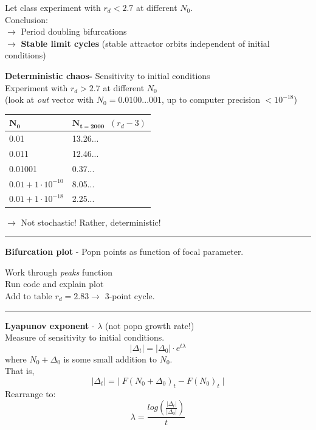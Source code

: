 \documentclass{article}
\newcommand{\note}[1]{\colorbox{gray!30}{#1}}
\newcommand{\ind}{\-\hspace{1cm}}
\begin{document}
\note{Let class experiment with $r_d<2.7$ at different $N_0$.}\\
Conclusion:\\
 \ind $\to$ Period doubling bifurcations\\
\ind \ind $\to$ \textbf{Stable limit cycles} (stable attractor orbits independent of initial conditions)

\textbf{Deterministic chaos-} Sensitivity to initial conditions\\
\note{Experiment with $r_d > 2.7$ at different $N_0$} \\
\ind (look at \emph{out} vector with $N_0=0.0100...001$, up to computer precision $<10^{-18}$)

\begin{table}[h]
\centering
\begin{tabular}{ll}
$\mathbf{N_0}$ & $\mathbf{N_{t=2000}}\;\; (r_d-3)$ \\ 
\hline
0.01 & 13.26...\\
0.011 & 12.46... \\
0.01001 & 0.37... \\
$0.01 + 1 \cdot 10^{-10} $ & 8.05...\\
$ 0.01 + 1 \cdot 10^{-18} $ & 2.25...\\
\hline
\end{tabular} 
\end{table}

$\to$ Not stochastic!  Rather, deterministic!

\rule[0.5ex]{\linewidth}{1pt}

\textbf{Bifurcation plot} - Popn points as function of focal parameter.

\ind \note{Work through \emph{peaks} function}\\
\ind \note{Run code and explain plot}\\
\ind \note{Add to table $r_d=2.83 \to$ 3-point cycle.}

\rule[0.5ex]{\linewidth}{1pt}

\textbf{Lyapunov exponent} - $\lambda$ (not popn growth rate!)\\
\ind Measure of sensitivity to initial conditions.\\
\begin{equation*}
	\vert \Delta_t \vert = \vert \Delta_0 \vert \cdot  e^{t \lambda}
\end{equation*}
\ind \ind where $N_0 + \Delta_0$ is some small addition to $N_0$.\\
That is,
\begin{equation*}
	\vert \Delta_t \vert = \vert \; F(N_0 + \Delta_0)_t - F(N_0)_t \; \vert
\end{equation*}
Rearrange to:
\begin{equation*}
	\lambda = \frac{log\left(\frac{\vert \Delta_t \vert}{\vert \Delta_0 \vert} \right)}{t}
\end{equation*}
\end{document}
